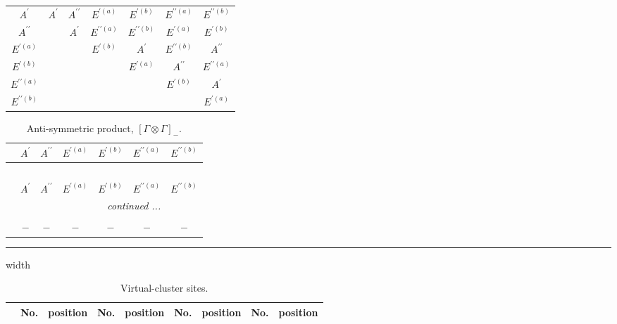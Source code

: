 \documentclass[fleqn,10pt,landscape]{article}
\begin{document}
\begin{itemize}
\begin{center}
\begin{longtable}{c|cccccc}
$ A^{\prime} $ & $ A^{\prime} $ & $ A^{\prime\prime} $ & $ E^{\prime(a)} $ & $ E^{\prime(b)} $ & $ E^{\prime\prime(a)} $ & $ E^{\prime\prime(b)} $ \\
$ A^{\prime\prime} $ & $  $ & $ A^{\prime} $ & $ E^{\prime\prime(a)} $ & $ E^{\prime\prime(b)} $ & $ E^{\prime(a)} $ & $ E^{\prime(b)} $ \\
$ E^{\prime(a)} $ & $  $ & $  $ & $ E^{\prime(b)} $ & $ A^{\prime} $ & $ E^{\prime\prime(b)} $ & $ A^{\prime\prime} $ \\
$ E^{\prime(b)} $ & $  $ & $  $ & $  $ & $ E^{\prime(a)} $ & $ A^{\prime\prime} $ & $ E^{\prime\prime(a)} $ \\
$ E^{\prime\prime(a)} $ & $  $ & $  $ & $  $ & $  $ & $ E^{\prime(b)} $ & $ A^{\prime} $ \\
$ E^{\prime\prime(b)} $ & $  $ & $  $ & $  $ & $  $ & $  $ & $ E^{\prime(a)} $ \\
\end{longtable}
\end{center}
\begin{center}
\renewcommand{\arraystretch}{1.0}
\begin{longtable}{ccccccc}
\caption{Anti-symmetric product, $[\Gamma\otimes\Gamma]_-$.}
 \\
 \hline \hline
 & $ A^{\prime} $ & $ A^{\prime\prime} $ & $ E^{\prime(a)} $ & $ E^{\prime(b)} $ & $ E^{\prime\prime(a)} $ & $ E^{\prime\prime(b)} $ \\ \hline \endfirsthead

\multicolumn{6}{l}{\tablename\ \thetable{}} \\
 \hline \hline
 & $ A^{\prime} $ & $ A^{\prime\prime} $ & $ E^{\prime(a)} $ & $ E^{\prime(b)} $ & $ E^{\prime\prime(a)} $ & $ E^{\prime\prime(b)} $ \\ \hline \endhead

 \hline \hline
\multicolumn{6}{r}{\footnotesize\it continued ...} \\ \endfoot

 \hline \hline
\multicolumn{6}{r}{} \\ \endlastfoot

$  $ & $ - $ & $ - $ & $ - $ & $ - $ & $ - $ & $ - $ \\
\end{longtable}
\end{center}

 \hfil \hrule height 1mm width \textwidth \hfil

{
\scriptsize
\begin{center}
\renewcommand{\arraystretch}{1.7}
\begin{longtable}{ccccccccc}
\caption{Virtual-cluster sites.}
 \\
 \hline \hline
 & No. & position & No. & position & No. & position & No. & position \\ \hline \endfirsthead


\end{longtable}
\end{center}}
\end{itemize}
\end{document}

